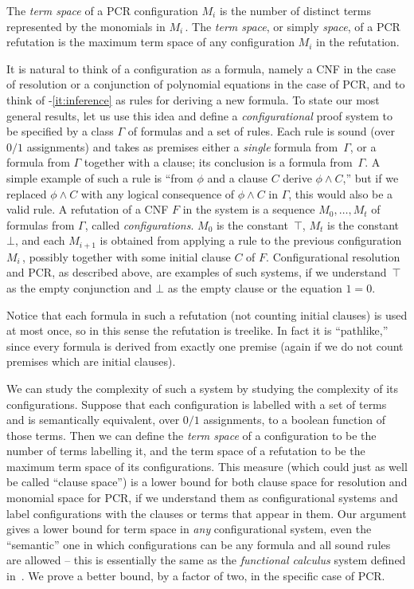 \documentclass{toc}
\begin{document}
\begin{definition}
The \emph{term space} of a PCR configuration $M_i$ is the number of distinct
terms represented by the monomials in $M_i$\,.
The \emph{term space}, or simply \emph{space}, of a PCR refutation is the maximum
term space of any configuration $M_i$ in the refutation.
\end{definition}


It is natural to think of a configuration as a formula, namely
a CNF in the case of resolution or a conjunction of polynomial equations in the case of PCR,
and to think of -\ref{it:inference} as rules for deriving a new formula.
To state our most general results, let us use this idea and define a \emph{configurational} proof system
to be specified by a class $\Gamma$ of formulas and a set of rules.
Each rule is sound (over $0/1$ assignments) and takes as premises
either a \emph{single} formula from~$\Gamma$, or a formula from $\Gamma$ together with a clause;
its conclusion is a formula from~$\Gamma$.
A simple example of such a rule is
``from $\phi$ and a clause $C$ derive $\phi \wedge C$,''
but if we replaced $\phi \wedge C$ with any logical consequence
of $\phi \wedge C$ in $\Gamma$, this would also be 
a valid rule.
 A refutation of a CNF $F$ 
in the system
is a sequence $M_0, \dots, M_t$ of formulas from $\Gamma$, called \emph{configurations}.
$M_0$ is the constant~$\top$, $M_t$ is the constant~$\bot$, and each $M_{i+1}$ is obtained
from applying a rule to the previous configuration~$M_i$\,, possibly together with some initial clause $C$ of $F$.
Configurational resolution and PCR,
as described above, are examples of such systems, if we understand~$\top$ as the empty conjunction and $\bot$
as the empty clause or the equation $1=0$. 

Notice that each formula in such a  refutation (not counting initial
clauses) is used at most once, so in this sense the refutation
 is treelike. In fact it is ``pathlike,''
since every formula is derived from exactly one premise (again if we do not count premises which are initial clauses).



We can study the complexity of such a system by studying the complexity of
its configurations. Suppose that each configuration is  labelled with a set of terms 
and is semantically equivalent, over $0/1$ assignments,  to a boolean function of those terms. 
Then we can define the \emph{term space} of a configuration to be the 
number of terms labelling it, %
%
and the term space of a refutation to be the maximum term space of its configurations.
This measure (which could just as well be called ``clause space'')  %
%
%
%
%
%
is a lower bound for %
both clause space for resolution and monomial space for PCR, if we understand them
as configurational systems and label configurations with the clauses or terms that
appear in them.
Our argument gives a lower bound for term space in \emph{any} configurational system,
even the ``semantic'' one in which configurations can be any formula and all sound rules are allowed
-- this is essentially the same as the \emph{functional calculus} system defined 
in~\cite{ABRW}. We prove a better bound, by a factor of two, in the specific case of PCR.
\end{document}
